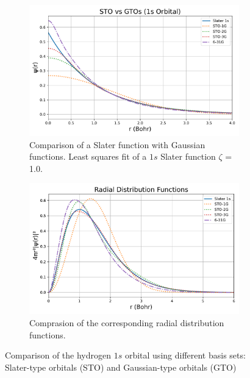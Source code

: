\begin{figure}[h]
  \centering

  \begin{subfigure}[b]{0.65\textwidth}
    \centering
    \includegraphics[width=\textwidth]{plt/gauss_slater_wavef.pdf}
    \caption{Comparison of a Slater function with Gaussian functions.
             Least squares fit of a $1s$ Slater function $\zeta$ = 1.0.}
  \end{subfigure}

  \begin{subfigure}[b]{0.65\textwidth}
    \centering
    \includegraphics[width=\textwidth]{plt/gauss_slater_radial.pdf}
    \caption{Comprasion of the corresponding radial distribution functions.}
  \end{subfigure}

  \caption{Comparison of the hydrogen $1s$ orbital using different basis sets:
    Slater-type orbitals (STO) and Gaussian-type orbitals (GTO)}
  \label{bs_gto_sto}
\end{figure}

